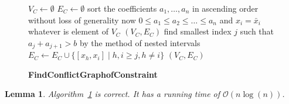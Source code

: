 \documentclass[titlepage, a4paper]{amsbook}
\theoremstyle{plain}
\newtheorem{lem}[thm]{Lemma}
\theoremstyle{break}
\theoremstyle{definition}
\theoremstyle{remark}
\numberwithin{equation}{thm}
\begin{document}
 \begin{figure}
  
  \IncMargin{1em}
\begin{algorithm}[H]
\LinesNumbered
{}
\BlankLine
$V_C \leftarrow \emptyset$\;
$E_C \leftarrow \emptyset$\;
sort the coefficients $a_1, \ldots, a_n$ in ascending order\;
without loss of generality now $0 \leq a_1 \leq a_2 \leq  \ldots \leq a_n$ and $x_i = \bar{x}_i$ whatever is element of $V_C$\;
{\Return $(V_C, E_C)$\;}
find smallest index $j$ such that $a_j +a_{j+1} > b$ by the method of nested intervals\;
$E_C \leftarrow E_C \cup \{[x_h, x_i]\mid h,i \geq j, h\neq i\}$\;
\Return $(V_C, E_C)$\;
\caption{\textbf{FindConflictGraphofConstraint}}\label{alg:FindConflictGraphconstr}
\end{algorithm}\DecMargin{1em}
\end{figure}
\begin{lem}
Algorithm~\ref{alg:FindConflictGraphconstr} is correct. It has a running time of $\mathcal{O}(n \log(n))$.
\end{lem}
\end{document}
